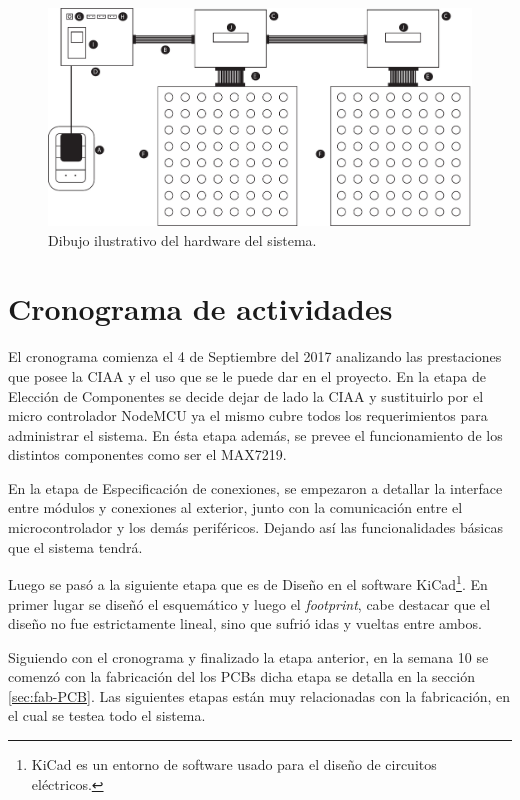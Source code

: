 	\begin{figure}[ht!]
		\begin{center}
			\centering
			\includegraphics[width=1.1\linewidth]{imagenes/dibujo-fisico.pdf}
			\caption{Dibujo ilustrativo del hardware del sistema.}
			\label{fig:dibujo-real}
		\end{center}
	\end{figure}

	
\section{Cronograma de actividades}
El cronograma comienza el 4 de Septiembre del 2017 analizando las prestaciones que posee la CIAA y el uso que se le puede dar en el proyecto. En la etapa de Elección de Componentes se decide dejar de lado la CIAA y sustituirlo por el micro controlador NodeMCU ya el mismo cubre todos los requerimientos para administrar el sistema.
En ésta etapa además, se prevee el funcionamiento de los distintos componentes como ser el MAX7219.

En la etapa de Especificación de conexiones, se empezaron a detallar la interface entre módulos y conexiones al exterior, junto con la comunicación entre el microcontrolador y los demás periféricos. Dejando así las funcionalidades básicas que el sistema tendrá.

Luego se pasó a la siguiente etapa que es de Diseño en el software KiCad\footnote{KiCad es un entorno de software usado para el diseño de circuitos eléctricos.}.
En primer lugar se diseñó el esquemático y luego el \emph{footprint}, cabe destacar que el diseño no fue estrictamente lineal, sino que sufrió idas y vueltas entre ambos.

Siguiendo con el cronograma y finalizado la etapa anterior, en la semana 10 se comenzó con la fabricación del los PCBs dicha etapa se detalla en la sección \ref{sec:fab-PCB}. Las siguientes etapas están muy relacionadas con la fabricación, en el cual se testea todo el sistema.

